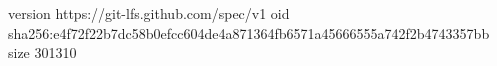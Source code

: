 version https://git-lfs.github.com/spec/v1
oid sha256:e4f72f22b7dc58b0efcc604de4a871364fb6571a45666555a742f2b4743357bb
size 301310
